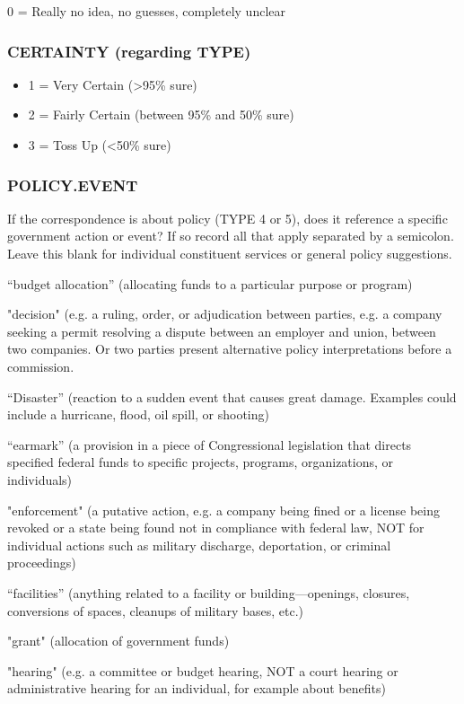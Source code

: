 \documentclass{article}
\begin{document}
0  = Really no idea, no guesses, completely unclear \\
 

\subsubsection{CERTAINTY (regarding TYPE)} 
\begin{itemize}
 \item[] 1 =  Very Certain (>95\% sure)
\item[] 2 = Fairly Certain (between 95\% and 50\% sure)
\item[] 3 = Toss Up (<50\% sure)
\end{itemize}

 

\subsubsection{POLICY.EVENT}
If the correspondence is about policy (TYPE 4 or 5), does it reference a specific government action or event? If so record all that apply separated by a semicolon. Leave this blank for individual constituent services or general policy suggestions.

“budget allocation” (allocating funds to a particular purpose or program)

"decision" (e.g. a ruling, order, or adjudication between parties, e.g. a company seeking a permit resolving a dispute between an employer and union, between two companies. Or two parties present alternative policy interpretations before a commission.

“Disaster” (reaction to a sudden event that causes great damage. Examples could include a hurricane, flood, oil spill, or shooting)

“earmark” (a provision in a piece of Congressional legislation that directs specified federal funds to specific projects, programs, organizations, or individuals)

"enforcement" (a putative action, e.g. a company being fined or a license being revoked or a state being found not in compliance with federal law, NOT for individual actions such as military discharge, deportation, or criminal proceedings)

“facilities” (anything related to a facility or building—openings, closures, conversions of spaces, cleanups of military bases, etc.)

"grant" (allocation of government funds)

"hearing" (e.g. a committee or budget hearing, NOT a court hearing or administrative hearing for an individual, for example about benefits)
\end{document}
